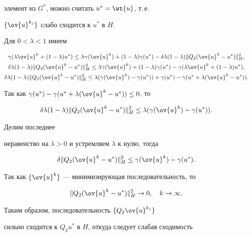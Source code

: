 элемент из $G^*$, можно считать $u^*=\wt{u}$, т.\,е.


$\{\ov{u}^{k_j}\}$ слабо сходится к $u^*$ в $H$.





Для $0<\lambda<1$ имеем


\begin{gather*}


\gamma(\lambda\ov{u}^k+(1-\lambda)u^*)\leq\lambda\gamma(\ov{u}^k)+


(1-\lambda)\gamma({u}^*)-\delta\lambda(1-\lambda)\|Q_2(\ov{u}^k-u^*)\|^2_H,\\


%


\delta\lambda(1-\lambda)\|Q_2(\ov{u}^k-u^*)\|^2_H\le\lambda\gamma(\ov{u}^k)+


(1-\lambda)\gamma({u}^*)-\gamma(\lambda\ov{u}^k+(1-\lambda)u^*),\\


%


\delta\lambda(1-\lambda)\|Q_2(\ov{u}^k-u^*)\|^2_H\le


\lambda(\gamma(\ov{u}^k)-\gamma(u^*))+\gamma(u^*)-


\gamma(u^*+\lambda(\ov{u}^k-u^*)).


\end{gather*}


Так как $\gamma(u^*)-\gamma(u^*+\lambda(\ov{u}^k-u^*))\le 0$, то


$$


\delta\lambda(1-\lambda)\|Q_2(\ov{u}^k-u^*)\|^2_H\le


\lambda(\gamma(\ov{u}^k)-\gamma(u^*)).


$$


Делим последнее


неравенство на $\lambda>0$ и устремляем $\lambda$ к нулю, тогда


$$


\delta\|Q_2(\ov{u}^k-u^*)\|^2_H\le\gamma(\ov{u}^k)-\gamma(u^*).


$$


Так как $\{\ov{u}^k\}$ --- минимизирующая последовательность, то


$$


\|Q_2(\ov{u}^k-u^*)\|^2_H\to 0,\quad k\to\infty.


$$


Таким образом, последовательность $\{Q_2\ov{u}^{k_j}\}$


сильно сходится к $Q_2u^*$ в $H$, откуда следует слабая сходимость


